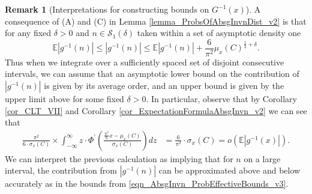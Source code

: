 \documentclass[11pt,reqno,a4letter]{article}
\numberwithin{figure}{section}
\numberwithin{table}{section}
\theoremstyle{plain}
\numberwithin{theorem}{section}
\theoremstyle{definition}
\newtheorem{remark}[theorem]{Remark}
\begin{document}
\begin{remark}[Interpretations for constructing bounds on $G^{-1}(x)$] 
A consequence of (A) and (C) in Lemma \ref{lemma_ProbsOfAbsgInvnDist_v2} 
is that for any fixed $\delta > 0$ and $n \in \mathcal{S}_1(\delta)$ 
taken within a set of asymptotic density one 
\begin{equation} 
\label{eqn_AbsgInvn_ProbEffectiveBounds_v3} 
\mathbb{E}|g^{-1}(n)| \leq |g^{-1}(n)| \leq \mathbb{E}|g^{-1}(n)| + \frac{6}{\pi^2} 
     \mu_x(C)^{\frac{1}{2} + \delta}. 
\end{equation} 
Thus when we integrate over a sufficiently spaced set of disjoint consecutive intervals, 
we can assume that an asymptotic lower bound on the 
contribution of $|g^{-1}(n)|$ is given by its average 
order, and an upper bound is given by the upper limit above for some fixed $\delta > 0$. 
In particular, observe that by 
Corollary \ref{cor_CLT_VII} and 
Corollary \ref{cor_ExpectationFormulaAbsgInvn_v2} 
we can see that 
\begin{align*} 
\frac{\pi^2}{6 \cdot \sigma_x(C)} \times \int_{-\infty}^{\infty} z \cdot 
     \Phi^{\prime}\left(\frac{\frac{\pi^2}{6} x - \mu_x(C)}{\sigma_x(C)}\right) dz & = 
     \frac{6}{\pi^2} \cdot \sigma_x(C) = o\left(\mathbb{E}|g^{-1}(x)|\right). 
\end{align*} 
We can interpret the previous calculation as implying that for $n$ on a large 
interval, the contribution from $|g^{-1}(n)|$ can be approximated above and below 
accurately as in the bounds from \eqref{eqn_AbsgInvn_ProbEffectiveBounds_v3}. 
\end{remark} 
\end{document}
